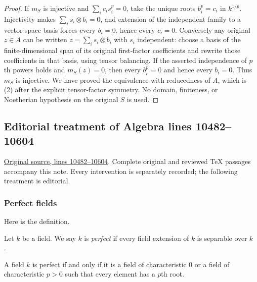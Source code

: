 \begin{proof}
If $m_S$ is injective and
$\sum_i c_i s_i^p=0$, take the unique roots
$b_i^p=c_i$ in $k^{1/p}$. Injectivity makes
$\sum_i s_i\otimes b_i=0$, and extension of the
independent family to a vector-space basis
forces every $b_i=0$, hence every $c_i=0$.
Conversely any original $z\in A$ can be written
$z=\sum_i s_i\otimes b_i$ with $s_i$ independent:
choose a basis of the finite-dimensional span
of its original first-factor coefficients and
rewrite those coefficients in that basis,
using tensor balancing. If the asserted
independence of $p$th powers holds and $m_S(z)=0$,
then every $b_i^p=0$ and hence every $b_i=0$.
Thus $m_S$ is injective. We have proved the
equivalence with reducedness of $A$, which is
(2) after the explicit tensor-factor symmetry.
No domain, finiteness, or Noetherian hypothesis
on the original $S$ is used.
\end{proof}


\subsection{Editorial treatment of Algebra lines 10482--10604}

\hypertarget{algebra-context-124}{}

\noindent\href{https://github.com/stacks/stacks-project/blob/a04446e57ec1fbc252a871afcec7752fb2807b14/algebra.tex\#L10482}{Original source, lines 10482--10604}. Complete original and reviewed TeX passages accompany this note. Every intervention is separately recorded; the following treatment is editorial.


\subsubsection{Perfect fields}
\label{editorial-source-section-perfect-fields}

\noindent
Here is the definition.

\begin{definition}
\label{editorial-source-definition-perfect}
Let $k$ be a field. We say $k$ is {\it perfect}
if every field extension of $k$ is separable over $k$.
\end{definition}

\begin{lemma}
\label{editorial-source-lemma-perfect}
A field $k$ is perfect if and only if it is a field of characteristic $0$
or a field of characteristic $p > 0$ such that every element has a $p$th
root.
\end{lemma}

